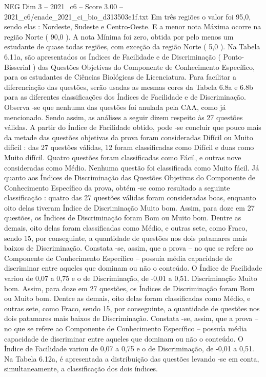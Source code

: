 \begin{textsample}{NEG Dim 3 – 2021\_c6 – Score 3.00 – 2021\_c6/enade\_2021\_ci\_bio\_d313503e1f.txt}
Em três regiões o valor foi 95,0, sendo elas : Nordeste, Sudeste e Centro-Oeste.
E a menor nota Máxima ocorre na região Norte ( 90,0 ).
A nota Mínima foi zero, obtida por pelo menos um estudante de quase todas regiões, com exceção da região Norte ( 5,0 ).
Na Tabela 6.11a, são apresentados os Índices de Facilidade e de Discriminação ( Ponto-Bisserial ) das Questões Objetivas do Componente de Conhecimento Específico, para os estudantes de Ciências Biológicas de Licenciatura.
Para facilitar a diferenciação das questões, serão usadas as mesmas cores da Tabela 6.8a e 6.8b para as diferentes classificações dos Índices de Facilidade e de Discriminação.
Observa -se que nenhuma das questões foi anulada pela CAA, como já mencionado.
Sendo assim, as análises a seguir dizem respeito às 27 questões válidas.
A partir do Índice de Facilidade obtido, pode -se concluir que pouco mais da metade das questões objetivas da prova foram consideradas Difícil ou Muito difícil : das 27 questões válidas, 12 foram classificadas como Difícil e duas como Muito difícil.
Quatro questões foram classificadas como Fácil, e outras nove consideradas como Médio.
Nenhuma questão foi classificada como Muito fácil.
Já quanto aos Índices de Discriminação das Questões Objetivas do Componente de Conhecimento Específico da prova, obtém -se como resultado a seguinte classificação : quatro das 27 questões válidas foram consideradas boas, enquanto oito delas tiveram Índice de Discriminação Muito bom.
Assim, para doze em 27 questões, os Índices de Discriminação foram Bom ou Muito bom.
Dentre as demais, oito delas foram classificadas como Médio, e outras sete, como Fraco, sendo 15, por conseguinte, a quantidade de questões nos dois patamares mais baixos de Discriminação.
Constata -se, assim, que a prova – no que se refere ao Componente de Conhecimento Específico – possuía média capacidade de discriminar entre aqueles que dominam ou não o conteúdo.
O Índice de Facilidade variou de 0,07 a 0,75 e o de Discriminação, de -0,01 a 0,51.
Discriminação Muito bom.
Assim, para doze em 27 questões, os Índices de Discriminação foram Bom ou Muito bom.
Dentre as demais, oito delas foram classificadas como Médio, e outras sete, como Fraco, sendo 15, por conseguinte, a quantidade de questões nos dois patamares mais baixos de Discriminação.
Constata -se, assim, que a prova – no que se refere ao Componente de Conhecimento Específico – possuía média capacidade de discriminar entre aqueles que dominam ou não o conteúdo.
O Índice de Facilidade variou de 0,07 a 0,75 e o de Discriminação, de -0,01 a 0,51.
Na Tabela 6.12a, é apresentada a distribuição das questões levando -se em conta, simultaneamente, a classificação dos dois índices.

\end{textsample}
